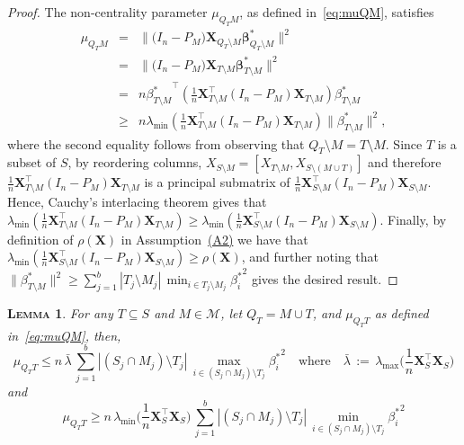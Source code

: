 \documentclass[
  12pt]{article}
\newcommand{\M}{\mathcal{M}}
\newcommand{\bbeta}{\boldsymbol{\beta}}
\newcommand{\bX}{\mathbf{X}}
\newtheorem{lem}[thm]{\textsc{Lemma}}
\begin{document}
\begin{proof} 
The non-centrality parameter $\mu_{Q_TM}$, as defined in~\eqref{eq:muQM}, satisfies
\begin{eqnarray*}
    \mu_{Q_TM}&=&\|\big(I_n-P_M\big) \bX_{Q_T\setminus M} \bbeta^*_{Q_T\setminus M}\|^2\\
    &=&\|\big(I_n-P_M\big) \bX_{T\setminus M} \bbeta^*_{T\setminus M}\|^2\\
    &= & n {\beta^*_{T\setminus M}}^\top \left(\tfrac1n \bX_{T\setminus M}^\top(I_n-P_M)\bX_{T\setminus M}\right)\beta^*_{T\setminus M}\\
    &\geq & n\lambda_{\min}\left(\tfrac1n \bX_{T\setminus M}^\top(I_n-P_M)\bX_{T\setminus M}\right)\|\beta^*_{T\setminus M}\|^2,
\end{eqnarray*}
where the second equality follows from observing that $Q_T\setminus M=T\setminus M$. Since $T$ is a subset of $S$, by reordering columns, $X_{S\setminus M}=[X_{T\setminus M},X_{S\setminus (M\cup T)}]$ and therefore $\tfrac1n \bX_{T\setminus M}^\top(I_n-P_M)\bX_{T\setminus M}$ is a principal submatrix of $\tfrac1n \bX_{S\setminus M}^\top(I_n-P_M)\bX_{S\setminus M}$. Hence, Cauchy's interlacing theorem gives that $\lambda_{\min}\left(\tfrac1n \bX_{T\setminus M}^\top(I_n-P_M)\bX_{T\setminus M}\right) \geq \lambda_{\min}\left(\tfrac1n \bX_{S\setminus M}^\top(I_n-P_M)\bX_{S\setminus M}\right)$. Finally, by definition of $\rho(\bX)$ in Assumption~\hyperlink{lab:A2}{(A2)} we have that
$\lambda_{\min}\left(\tfrac1n \bX_{S\setminus M}^\top(I_n-P_M)\bX_{S\setminus M}\right) \geq \rho(\bX)$, and further noting that $\|\beta^*_{T\setminus M}\|^2\geq \sum_{j=1}^b|T_j\setminus M_j|\,\min_{i\in T_j\setminus M_j}{\beta_{i}^*}^2$ gives the desired result.
\end{proof}


\begin{lem}\label{lem:upperboundnoncentralgen}
    For any $T\subseteq S$ and $M\in \M$, let $Q_T=M\cup T$, and $\mu_{Q_T T}$ as defined in~\eqref{eq:muQM}, then, 
    \begin{equation}\label{eq:upperbounnnnnd}
      \mu_{Q_TT} \leq n\,\bar{\lambda}\,\sum_{j=1}^b|(S_j\cap M_j )\setminus T_j|\,\max_{i\in (S_j\cap M_j )\setminus T_j}{\beta_{i}^*}^2 \quad \text{where}\quad \bar{\lambda}\,:=\,\lambda_{\max}\Big(\frac1n \bX_{S}^\top\bX_{S}\Big)  
    \end{equation}
    and
    \begin{equation}\label{eq:lowerbounnnnnd}
    \mu_{Q_TT} \geq n\,\lambda_{\min}\Big(\frac1n \bX_{S}^\top\bX_{S}\Big)\,\sum_{j=1}^b|(S_j\cap M_j )\setminus T_j|\,\min_{i\in (S_j\cap M_j )\setminus T_j}{\beta_{i}^*}^2
    \end{equation}
\end{lem}
\end{document}
